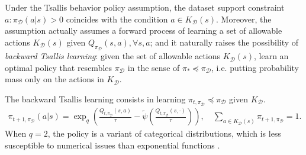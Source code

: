 \documentclass{article}
\newcommand{\AdaBracket}[1]{\left(#1\right)}
\newcommand{\AdaRectBracket}[1]{\left[#1\right]}
\newcommand{\expectation}[2]{\mathbb{E}_{#1}\AdaRectBracket{#2}}
\newcommand{\datasetOptimalQ}{Q_{*, \pi_{\mathcal{D}}}}
\newcommand{\datasetPolicy}{\pi_{\mathcal{D}}}
\begin{document}
Under the Tsallis behavior policy assumption, the dataset support constraint $a: \datasetPolicy(a|s) > 0$ coincides with the condition $a \in K_{\mathcal{D}}(s)$.
Moreover, the assumption actually assumes a forward process of learning a set of allowable actions $K_\mathcal{D}(s)$ given $Q_{\datasetPolicy}(s,a), \forall s,a$;
 and it naturally raises the possibility of \emph{backward Tsallis learning}: given the set of allowable actions $K_\mathcal{D}(s)$, learn an optimal policy that resembles $\datasetPolicy$ in the sense of $\pi_* \preceq \datasetPolicy$, i.e. putting probability mass only on the actions in $K_\mathcal{D}$.

 The backward Tsallis learning consists in learning $\pi_{t, \datasetPolicy} \preceq \datasetPolicy$ given $K_\mathcal{D}$.
\begin{align}
    \pi_{t+1, \datasetPolicy}(a|s) = \exp_q\AdaBracket{\frac{Q_{t, \datasetPolicy}(s,a)}{\tau} - \tilde{\psi}{\AdaBracket{\frac{Q_{t, \datasetPolicy}(s,\cdot)}{\tau}}}},  \quad \sum_{a\in K_{\mathcal{D}}(s)} \pi_{t+1, \datasetPolicy} = 1.
    \label{eq:proposal_policy}
\end{align}
When $q=2$, the policy is a variant of categorical distributions, which is less susceptible to numerical issues than exponential functions \cite{Tsai2021-selfsupervisedRelativePredictiveCoding}.



\end{document}
